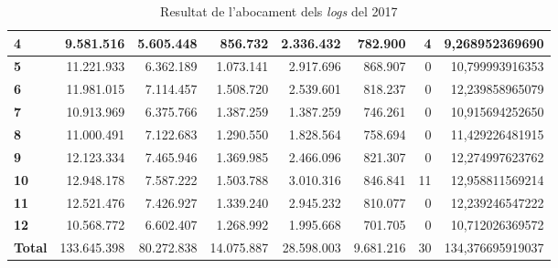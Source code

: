 \begin{table}[h!]
\begin{adjustbox}{width=1.2\textwidth, center}
\begin{tabular}{|l|r|r|r|r|r|r|r|}
            \textbf{4}     & 9.581.516   & 5.605.448  & 856.732    & 2.336.432  & 782.900   & 4  & 9,268952369690   \\
            \midrule
            \textbf{5}     & 11.221.933  & 6.362.189  & 1.073.141  & 2.917.696  & 868.907   & 0  & 10,799993916353  \\
            \textbf{6}     & 11.981.015  & 7.114.457  & 1.508.720  & 2.539.601  & 818.237   & 0  & 12,239858965079  \\
            \textbf{7}     & 10.913.969  & 6.375.766  & 1.387.259  & 1.387.259  & 746.261   & 0  & 10,915694252650  \\
            \textbf{8}     & 11.000.491  & 7.122.683  & 1.290.550  & 1.828.564  & 758.694   & 0  & 11,429226481915  \\
            \midrule
            \textbf{9}     & 12.123.334  & 7.465.946  & 1.369.985  & 2.466.096  & 821.307   & 0  & 12,274997623762  \\
            \textbf{10}    & 12.948.178  & 7.587.222  & 1.503.788  & 3.010.316  & 846.841   & 11 & 12,958811569214  \\
            \textbf{11}    & 12.521.476  & 7.426.927  & 1.339.240  & 2.945.232  & 810.077   & 0  & 12,239246547222  \\
            \textbf{12}    & 10.568.772  & 6.602.407  & 1.268.992  & 1.995.668  & 701.705   & 0  & 10,712026369572  \\
            \midrule
            \textbf{Total} & 133.645.398 & 80.272.838 & 14.075.887 & 28.598.003 & 9.681.216 & 30 & 134,376695919037 \\
            \bottomrule
        \end{tabular}
    \end{adjustbox}
    \caption{Resultat de l'abocament dels \textit{logs} del 2017}
    \label{tab:logs-table-2017}
\end{table}
